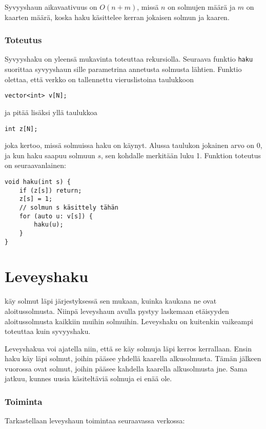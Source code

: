 Syvyyshaun aikavaativuus on $O(n+m)$,
missä $n$ on solmujen määrä ja $m$ on kaarten määrä,
koska haku käsittelee kerran jokaisen solmun ja kaaren.

\subsubsection*{Toteutus}

Syvyyshaku on yleensä mukavinta toteuttaa
rekursiolla.
Seuraava funktio \texttt{haku}
suorittaa syvyyshaun sille parametrina
annetusta solmusta lähtien.
Funktio olettaa, että
verkko on tallennettu vieruslistoina
taulukkoon
\begin{lstlisting}
vector<int> v[N];
\end{lstlisting}
ja pitää lisäksi yllä taulukkoa
\begin{lstlisting}
int z[N];
\end{lstlisting}
joka kertoo, missä solmuissa haku on käynyt.
Alussa taulukon jokainen arvo on 0,
ja kun haku saapuu solmuun $s$,
sen kohdalle merkitään luku 1.
Funktion toteutus on seuraavanlainen:
\begin{lstlisting}
void haku(int s) {
    if (z[s]) return;
    z[s] = 1;
    // solmun s käsittely tähän
    for (auto u: v[s]) {
        haku(u);
    }
}
\end{lstlisting}

\section{Leveyshaku}


käy solmut läpi järjestyksessä sen mukaan,
kuinka kaukana ne ovat aloitussolmusta.
Niinpä leveyshaun avulla pystyy laskemaan
etäisyyden aloitussolmusta kaikkiin
muihin solmuihin.
Leveyshaku on kuitenkin vaikeampi
toteuttaa kuin syvyyshaku.

Leveyshakua voi ajatella niin,
että se käy solmuja läpi kerros kerrallaan.
Ensin haku käy läpi solmut,
joihin pääsee yhdellä kaarella
alkusolmusta.
Tämän jälkeen vuorossa ovat
solmut, joihin pääsee kahdella
kaarella alkusolmusta jne.
Sama jatkuu, kunnes uusia käsiteltäviä
solmuja ei enää ole.

\subsubsection*{Toiminta}

Tarkastellaan leveyshaun toimintaa
seuraavassa verkossa:


